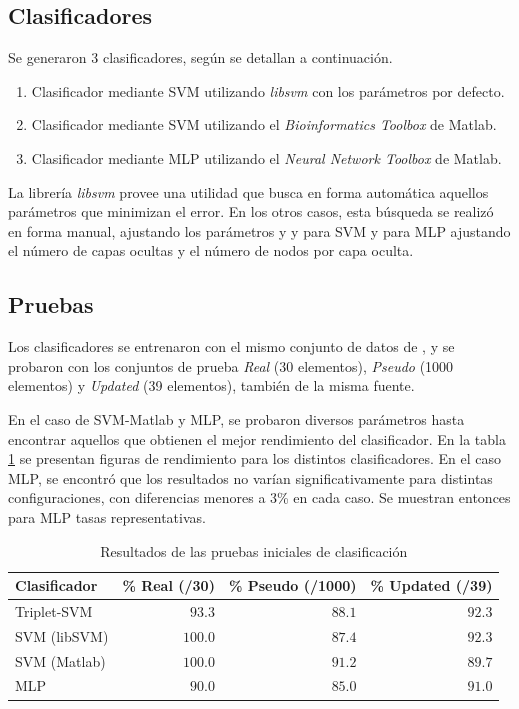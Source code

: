 \documentclass[12pt,bibliography=oldstyle,DIV=12,parskip=half-]{scrreprt}
\begin{document}
\subsection{Clasificadores}
Se generaron 3 clasificadores, según se detallan a continuación.
\begin{enumerate}
\item Clasificador mediante SVM utilizando \emph{libsvm}\cite{libsvm} con los
  parámetros por defecto.
\item Clasificador mediante SVM utilizando el \emph{Bioinformatics
  Toolbox} de Matlab.
\item Clasificador mediante MLP utilizando el \emph{Neural Network
  Toolbox} de Matlab.
\end{enumerate}
%
La librería \emph{libsvm}\cite{libsvm} provee una utilidad  que
busca en forma automática aquellos parámetros que minimizan el
error. En los otros casos, esta búsqueda se realizó en forma manual,
ajustando los parámetros  y y  para
SVM y para MLP ajustando el número de capas ocultas y el número de
nodos por capa oculta.
%
\subsection{Pruebas}
Los clasificadores se entrenaron con el mismo conjunto de datos de
\cite{xue}, y se probaron con los conjuntos de prueba \emph{Real} (30
elementos), \emph{Pseudo} (1000 elementos) y \emph{Updated} (39
elementos), también de la misma fuente.

En el caso de SVM-Matlab y MLP, se probaron diversos parámetros hasta
encontrar aquellos que obtienen el mejor rendimiento del clasificador.
En la tabla \ref{testresults} se presentan figuras de rendimiento para
los distintos clasificadores. %
En el caso MLP, se encontró que los resultados no varían
significativamente para distintas configuraciones, con diferencias
menores a 3\% en cada caso.  Se muestran entonces para MLP tasas
representativas.
%
\begin{table}
  \caption{Resultados de las pruebas iniciales de clasificación}
  \center%
  \begin{tabular}{lrrr}\toprule
    Clasificador  & \% Real (/30) &
                     \% Pseudo (/1000) & \% Updated (/39) \\\midrule
    Triplet-SVM   &  $93.3$    & $88.1$     & $92.3$     \\
    SVM (libSVM)  & $100.0$    & $87.4$     & $92.3$     \\
    SVM (Matlab)  & $100.0$    & $91.2$     & $89.7$     \\
    MLP           &  $90.0$    & $85.0$     & $91.0$  \\\bottomrule
  \end{tabular}
  \label{testresults}
\end{table}
%
\end{document}

